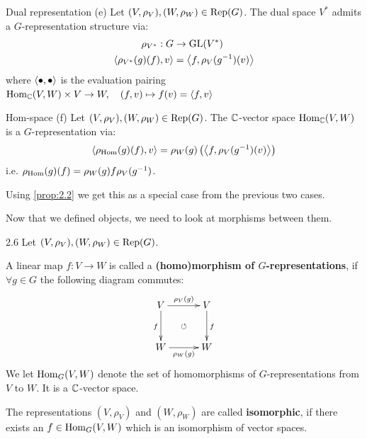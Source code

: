 \documentclass[twoside = false,	%
		headsepline,		%
		parskip = true,
		]{scrbook}						%
\begin{document}
    \begin{definition*}
    {Dual representation (e)}
        Let $(V,\rho_V), (W,\rho_W) \in \mathrm{Rep}(G)$. The dual space $V^*$ admits a $G$-representation structure via:
        \begin{equation*}
        \begin{split}
            \rho_{V^*}: G &\to\mathrm{GL}(V^*) \\
                \left\langle \rho_{V^*}(g)(f),v\right\rangle &= \left\langle f,\rho_V(g^{-1})(v)\right\rangle
        \end{split}
        \end{equation*}
        where $\left\langle \bullet,\bullet\right\rangle$ is the evaluation pairing $\mathrm{Hom}_\mathbb C(V,W) \times V \to W, \quad (f,v) \mapsto f(v) = \left\langle f,v\right\rangle$
    \end{definition*}
    
    \begin{definition*}
    {Hom-space (f)}
        Let $(V,\rho_V), (W,\rho_W) \in \mathrm{Rep}(G)$. The $\mathbb C$-vector space $\mathrm{Hom}_\mathbb C(V,W)$ is a $G$-representation via:
        \begin{equation*}
        \begin{split}
            \left\langle \rho_{\mathrm{Hom}}(g)(f),v\right\rangle = \rho_W(g)\left( \left\langle f,\rho_V(g^{-1})(v)\right\rangle\right)
        \end{split}
        \end{equation*}
        i.e. $\rho_{\mathrm{Hom}}(g)(f) = \rho_W(g) f \rho_V(g^{-1})$.
    \end{definition*}
    \begin{remark*}{}
        Using \ref{prop:2.2} we get this as a special case from the previous two cases.
    \end{remark*}
    
    Now that we defined objects, we need to look at morphisms between them.
    
    \begin{definition}{}{2.6}
        Let $(V,\rho_V), (W,\rho_W) \in \mathrm{Rep}(G)$.
        
        A linear map $f: V \to W$ is called a \textbf{(homo)morphism of $G$-representations}, if $\forall g \in G$ the following diagram commutes:
        \begin{equation*}
        \xymatrix @C=30pt @R=30pt{
            V \ar^{\rho_V(g)}[r] \ar_{f}[d] & V\ar^{f}[d] \\
            W \ar_{\rho_W(g)}[r] & W\ar@{}|{\circlearrowleft}[ul]
        }
        \end{equation*}
        We let $\mathrm{Hom}_G(V,W)$ denote the set of homomorphisms of $G$-representations from $V$ to $W$. It is a $\mathbb C$-vector space.
        
        The representations $(V,\rho_V)$ and $(W,\rho_W)$ are called \textbf{isomorphic}, if there exists an $f \in \mathrm{Hom}_G(V,W)$ which is an isomorphism of vector spaces.
    \end{definition}
    
\end{document}
